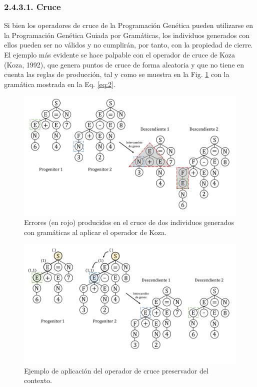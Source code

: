 \documentclass[spanish,a4paper,12pt,twoside]{report}
\begin{document}
      \subsubsection*{\normalsize 2.4.3.1. Cruce}
      Si bien los operadores de cruce de la Programación Genética pueden utilizarse en la Programación Genética Guiada por Gramáticas, los individuos generados con ellos pueden ser no válidos y no cumplirán, por tanto, con la propiedad de cierre. El ejemplo más evidente se hace palpable con el operador de cruce de Koza (Koza, 1992), que genera puntos de cruce de forma aleatoria y que no tiene en cuenta las reglas de producción, tal y como se muestra en la Fig. \ref{fig:7} con la gramática mostrada en la Eq. \ref{eq:2}. \par
      \begin{figure}[H]
        \centering
        \includegraphics[width = 1\textwidth]{resources/Fig7.pdf}
        \caption{Errores (en rojo) producidos en el cruce de dos individuos generados con gramáticas al aplicar el operador de Koza.}
        \label{fig:7}
      \end{figure} 
        \begin{figure}[H]
          \centering
          \includegraphics[width = 1\textwidth]{resources/Fig8.pdf}
          \caption{Ejemplo de aplicación del operador de cruce preservador del contexto.}
          \label{fig:8}
        \end{figure} \par \vfill
      
\end{document}
